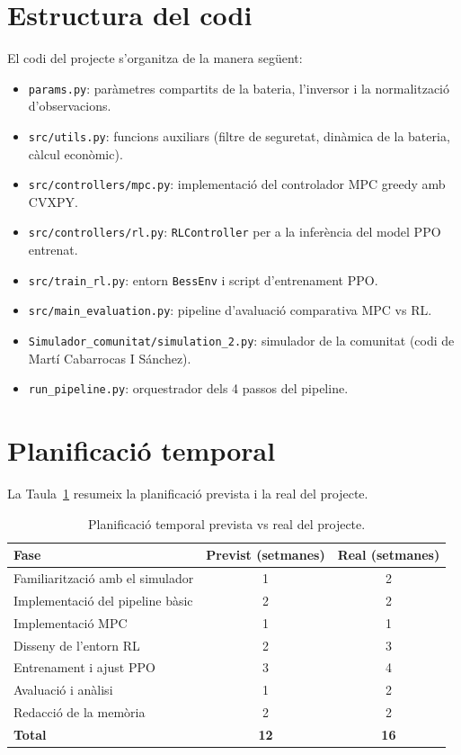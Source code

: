 \documentclass[a4paper,12pt,twoside]{ThesisStyle}
\begin{document}
\section{Estructura del codi}

El codi del projecte s'organitza de la manera següent:

\begin{itemize}
    \item \texttt{params.py}: paràmetres compartits de la bateria, l'inversor i la normalització d'observacions.
    \item \texttt{src/utils.py}: funcions auxiliars (filtre de seguretat, dinàmica de la bateria, càlcul econòmic).
    \item \texttt{src/controllers/mpc.py}: implementació del controlador MPC greedy amb CVXPY.
    \item \texttt{src/controllers/rl.py}: \texttt{RLController} per a la inferència del model PPO entrenat.
    \item \texttt{src/train\_rl.py}: entorn \texttt{BessEnv} i script d'entrenament PPO.
    \item \texttt{src/main\_evaluation.py}: pipeline d'avaluació comparativa MPC vs RL.
    \item \texttt{Simulador\_comunitat/simulation\_2.py}: simulador de la comunitat (codi de Martí Cabarrocas I Sánchez).
    \item \texttt{run\_pipeline.py}: orquestrador dels 4 passos del pipeline.
\end{itemize}

\section{Planificació temporal}

La Taula~\ref{taula:planificacio} resumeix la planificació prevista i la real del projecte.

\begin{table}[htb]
\centering
\begin{tabular}{@{}lcc@{}}
\toprule
\textbf{Fase} & \textbf{Previst (setmanes)} & \textbf{Real (setmanes)} \\
\midrule
Familiarització amb el simulador & 1 & 2 \\
Implementació del pipeline bàsic & 2 & 2 \\
Implementació MPC & 1 & 1 \\
Disseny de l'entorn RL & 2 & 3 \\
Entrenament i ajust PPO & 3 & 4 \\
Avaluació i anàlisi & 1 & 2 \\
Redacció de la memòria & 2 & 2 \\
\midrule
\textbf{Total} & \textbf{12} & \textbf{16} \\
\bottomrule
\end{tabular}
\caption{Planificació temporal prevista vs real del projecte.}
\label{taula:planificacio}
\end{table}
\end{document}
